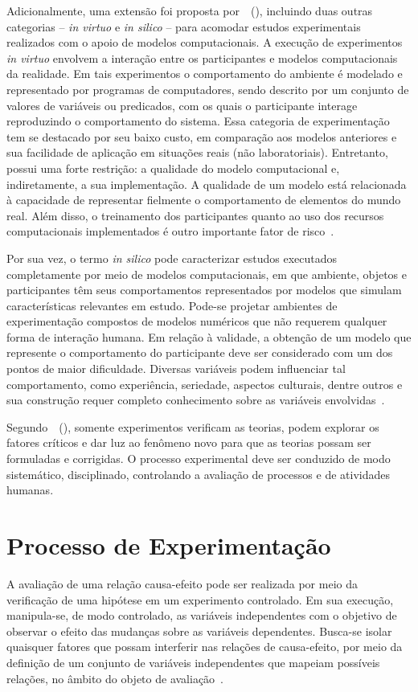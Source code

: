Adicionalmente, uma extensão foi proposta por~~(\citeyear{travassos2003contributions}), incluindo duas outras categorias -- \textit{in virtuo} e \textit{in silico} -- para acomodar estudos experimentais realizados com o apoio de modelos computacionais. A execução de experimentos \textit{in virtuo} envolvem a interação entre os participantes e modelos computacionais da realidade. Em tais experimentos o comportamento do ambiente é modelado e representado por programas de computadores, sendo descrito por um conjunto de valores de variáveis ou predicados, com os quais o participante interage reproduzindo o comportamento do sistema. Essa categoria de experimentação tem se destacado por seu baixo custo, em comparação aos modelos anteriores e sua facilidade de aplicação em situações reais (não laboratoriais).  Entretanto, possui uma forte restrição: a qualidade do modelo computacional e, indiretamente, a sua implementação. A qualidade de um modelo está relacionada à capacidade de representar fielmente o comportamento de elementos do mundo real. Além disso, o treinamento dos participantes quanto ao uso dos recursos computacionais implementados é outro importante fator de risco~\cite{travassos2003contributions}. 

Por sua vez, o termo \textit{in silico} pode caracterizar estudos executados completamente por meio de modelos computacionais, em que ambiente, objetos e participantes têm seus comportamentos representados por modelos que simulam características relevantes em estudo. Pode-se projetar ambientes de experimentação compostos de modelos numéricos que não requerem qualquer forma de interação humana. Em relação à validade, a obtenção de um modelo que represente o comportamento do participante deve ser considerado com um dos pontos de maior dificuldade. Diversas variáveis podem influenciar tal comportamento, como experiência, seriedade, aspectos culturais, dentre outros e sua construção requer completo conhecimento sobre as variáveis envolvidas~\cite{travassos2003contributions}.

Segundo~~(\citeyear{Travassos02}), somente experimentos verificam as teorias, podem explorar os fatores críticos e dar luz ao fenômeno novo para que as teorias possam ser formuladas e corrigidas. O processo experimental deve ser conduzido de modo sistemático, disciplinado, controlando a avaliação de processos e de atividades humanas.

\section{Processo de Experimentação}
\label{sect:processoexperimentacao}
A avaliação de uma relação causa-efeito pode ser realizada por meio da verificação de uma hipótese em um experimento controlado. Em sua execução, manipula-se, de modo controlado, as variáveis independentes com o objetivo de observar o efeito das mudanças sobre as variáveis dependentes. Busca-se isolar quaisquer fatores que possam interferir nas relações de causa-efeito, por meio da definição de um conjunto de variáveis independentes que mapeiam possíveis relações, no âmbito do objeto de avaliação~\cite{Garcia06}. 

